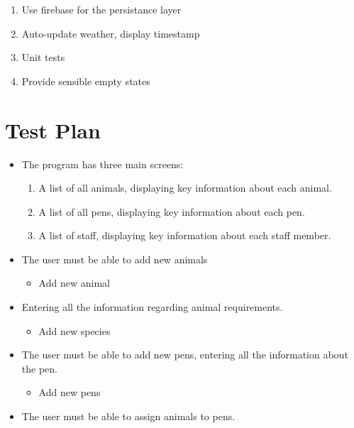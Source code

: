 \documentclass[english,a4paper,]{report}
\providecommand{\tightlist}{%
  \setlength{\itemsep}{0pt}\setlength{\parskip}{0pt}}
\begin{document}
\begin{enumerate}
\def\labelenumi{\arabic{enumi}.}
\tightlist
\item
  Use firebase for the persistance layer
\item
  Auto-update weather, display timestamp
\item
  Unit tests
\item
  Provide sensible empty states
\end{enumerate}

\hypertarget{test-plan}{%
\chapter{Test Plan}\label{test-plan}}

\begin{itemize}
\tightlist
\item
  The program has three main screens:

  \begin{enumerate}
  \def\labelenumi{\arabic{enumi}.}
  \tightlist
  \item
    A list of all animals, displaying key information about each animal.
  \item
    A list of all pens, displaying key information about each pen.
  \item
    A list of staff, displaying key information about each staff member.
  \end{enumerate}
\item
  The user must be able to add new animals

  \begin{itemize}
  \tightlist
  \item
    Add new animal
  \end{itemize}
\item
  Entering all the information regarding animal requirements.

  \begin{itemize}
  \tightlist
  \item
    Add new species
  \end{itemize}
\item
  The user must be able to add new pens, entering all the information
  about the pen.

  \begin{itemize}
  \tightlist
  \item
    Add new pens
  \end{itemize}
\item
  The user must be able to assign animals to pens.


\end{itemize}
\end{document}

